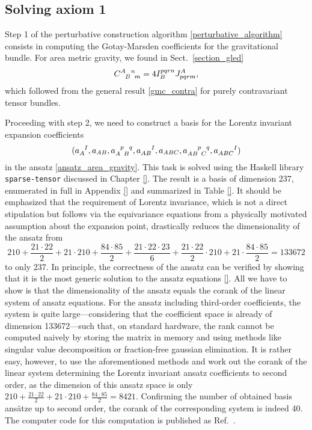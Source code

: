 \subsection{Solving axiom 1}\label{sect_area_lagrangian}
Step 1 of the perturbative construction algorithm \ref{perturbative_algorithm} consists in computing the Gotay-Marsden coefficients for the gravitational bundle. For area metric gravity, we found in Sect.~\ref{section_gled}
\begin{equation}
  \gmc{A}{B}{n}{m} = 4 I^{pqrn}_B J^A_{pqrm},
\end{equation}
which followed from the general result \eqref{gmc_contra} for purely contravariant tensor bundles.

Proceeding with step 2, we need to construct a basis for the Lorentz invariant expansion coefficients
\begin{equation}
  (a_A^{\hphantom AI}, a_{AB}, a_{A\hphantom pB}^{\hphantom Ap\hphantom Bq}, a_{AB}^{\hphantom{AB}I}, a_{ABC}, a_{AB\hphantom pC}^{\hphantom{AB}p\hphantom Cq}, a_{ABC}^{\hphantom{ABC}I})
\end{equation}
in the ansatz \eqref{ansatz_area_gravity}. This task is solved using the Haskell library \texttt{sparse-tensor} \cite{sparse-tensor} discussed in Chapter \ref{}. The result is a basis of dimension 237, enumerated in full in Appendix \ref{} and summarized in Table \ref{}. It should be emphasized that the requirement of Lorentz invariance, which is not a direct stipulation but follows via the equivariance equations from a physically motivated assumption about the expansion point, drastically reduces the dimensionality of the ansatz from
\begin{equation}
  210 + \frac{21\cdot 22}{2} + 21\cdot 210 + \frac{84\cdot 85}{2} + \frac{21\cdot 22\cdot 23}{6} + \frac{21\cdot 22}{2} \cdot  210 + 21\cdot\frac{84\cdot 85}{2} = 133672
\end{equation}
to only 237. In principle, the correctness of the ansatz can be verified by showing that it is the most generic solution to the ansatz equations \ref{}. All we have to show is that the dimensionality of the ansatz equals the corank of the linear system of ansatz equations. For the ansatz including third-order coefficients, the system is quite large---considering that the coefficient space is already of dimension 133672---such that, on standard hardware, the rank cannot be computed naively by storing the matrix in memory and using methods like singular value decomposition or fraction-free gaussian elimination. It is rather easy, however, to use the aforementioned methods and work out the corank of the linear system determining the Lorentz invariant ansatz coefficients to second order, as the dimension of this ansatz space is only $210 + \frac{21\cdot 22}{2} + 21 \cdot 210 + \frac{84\cdot 85}{2} = 8421$. Confirming the number of obtained basis ansätze up to second order, the corank of the corresponding system is indeed 40. The computer code for this computation is published as Ref.~\cite{second-order-area-repo}.
